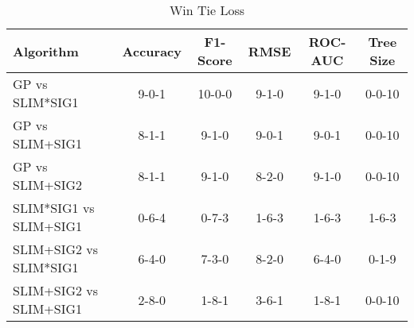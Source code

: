 
    \begin{table}[H]
        \centering
        \renewcommand{\arraystretch}{1.2}
        \caption{Win Tie Loss}
        \label{tab:final_comparison_wtl}
    \begin{tabular}{lccccc}
\toprule
Algorithm & Accuracy & F1-Score & RMSE & ROC-AUC & Tree Size \\
\midrule
GP vs SLIM*SIG1 & 9-0-1 & 10-0-0 & 9-1-0 & 9-1-0 & 0-0-10 \\
GP vs SLIM+SIG1 & 8-1-1 & 9-1-0 & 9-0-1 & 9-0-1 & 0-0-10 \\
GP vs SLIM+SIG2 & 8-1-1 & 9-1-0 & 8-2-0 & 9-1-0 & 0-0-10 \\
SLIM*SIG1 vs SLIM+SIG1 & 0-6-4 & 0-7-3 & 1-6-3 & 1-6-3 & 1-6-3 \\
SLIM+SIG2 vs SLIM*SIG1 & 6-4-0 & 7-3-0 & 8-2-0 & 6-4-0 & 0-1-9 \\
SLIM+SIG2 vs SLIM+SIG1 & 2-8-0 & 1-8-1 & 3-6-1 & 1-8-1 & 0-0-10 \\
\bottomrule
\end{tabular}

        
    \end{table}
    